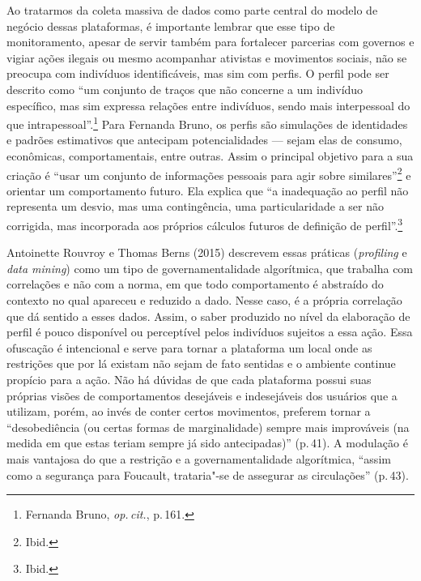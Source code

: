 Ao tratarmos da coleta massiva de dados como parte central do modelo de
negócio dessas plataformas, é importante lembrar que esse tipo de
monitoramento, apesar de servir também para fortalecer parcerias com
governos e vigiar ações ilegais ou mesmo acompanhar ativistas e
movimentos sociais, não se preocupa com indivíduos identificáveis, mas
sim com perfis. O perfil pode ser descrito como ``um conjunto de traços
que não concerne a um indivíduo específico, mas sim expressa relações
entre indivíduos, sendo mais interpessoal do que intrapessoal''.\footnote{Fernanda Bruno, \textit{op.\,cit.}, p.\,161.} Para Fernanda Bruno, os perfis são simulações de identidades e
padrões estimativos que antecipam potencialidades ­--- sejam elas de
consumo, econômicas, comportamentais, entre outras. Assim o principal
objetivo para a sua criação é ``usar um conjunto de informações pessoais
para agir sobre similares''\footnote{Ibid.} e orientar um comportamento futuro.
Ela explica que ``a inadequação ao perfil não representa um desvio, mas
uma contingência, uma particularidade a ser não corrigida, mas
incorporada aos próprios cálculos futuros de definição de
perfil''.\footnote{Ibid.}

Antoinette Rouvroy e Thomas Berns (2015) descrevem essas práticas
(\emph{profiling} e \emph{data mining}) como um tipo de
governamentalidade algorítmica, que trabalha com correlações e não com a
norma, em que todo comportamento é abstraído do contexto no qual
apareceu e reduzido a dado. Nesse caso, é a própria correlação que dá
sentido a esses dados. Assim, o saber produzido no nível da elaboração
de perfil é pouco disponível ou perceptível pelos indivíduos sujeitos a
essa ação. Essa ofuscação é intencional e serve para tornar a plataforma
um local onde as restrições que por lá existam não sejam de fato
sentidas e o ambiente continue propício para a ação. Não há dúvidas de
que cada plataforma possui suas próprias visões de comportamentos
desejáveis e indesejáveis dos usuários que a utilizam, porém, ao invés
de conter certos movimentos, preferem tornar a ``desobediência (ou
certas formas de marginalidade) sempre mais improváveis (na medida em
que estas teriam sempre já sido antecipadas)'' (p.\,41). A modulação é mais
vantajosa do que a restrição e a governamentalidade algorítmica, ``assim
como a segurança para Foucault, trataria"-se de assegurar as
circulações'' (p.\,43).

